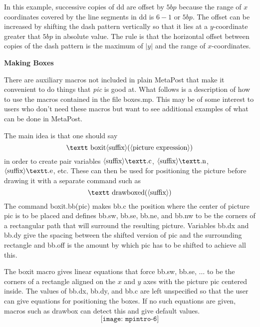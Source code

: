 \documentclass{article}
\def\descr#1{{\langle\hbox{#1}\rangle}}
\def\lit#1{{\hbox{\textt#1}}}
\def\okbreak{\vfil\penalty2000 \vfilneg}
\begin{document}
In this example, successive copies of \lit{dd} are offset by $5bp$ because
the range of $x$ coordinates covered by the line segments in \lit{dd} is
$6-1$ or $5bp$.  The offset can be increased by shifting the dash pattern
vertically so that it lies at a $y$-coordinate greater that $5bp$ in
absolute value.  The rule is that the horizontal offset between copies of
the dash pattern is the maximum of $|y|$ and the range of $x$-coordinates.

\bigbreak
\centerline{\bf Making Boxes}
\nobreak\medskip
There are auxiliary macros not included in plain MetaPost that make it
convenient to do things that {\it pic} is good at.  What follows
is a description of how to use the macros contained in the file \lit{boxes.mp}.
This may be of some interest to users who don't need these macros but want to
see additional examples of what can be done in MetaPost.

The main idea is that one should say
$$ \lit{boxit} \descr{suffix}(\descr{picture expression}) $$
in order to create pair variables $\descr{suffix}\lit{.c}$,
$\descr{suffix}\lit{.n}$, $\descr{suffix}\lit{.e}$, etc.  These can then be
used for positioning the picture before drawing it with a separate command such
as
$$ \lit{drawboxed}(\descr{suffix}) $$
The command \lit{boxit.bb(pic)} makes \lit{bb.c} the position where the center
of picture \lit{pic} is to be placed and defines \lit{bb.sw}, \lit{bb.se},
\lit{bb.ne}, and \lit{bb.nw} to be the corners of a rectangular path that will
surround the resulting picture.  Variables \lit{bb.dx} and \lit{bb.dy} give
the spacing between the shifted version of \lit{pic} and the surrounding
rectangle and \lit{bb.off} is the amount by which \lit{pic} has to be shifted
to achieve all this.

The \lit{boxit} macro gives linear equations that force \lit{bb.sw},
\lit{bb.se}, $\ldots$ to be the corners of a rectangle aligned on the $x$ and
$y$ axes with the picture \lit{pic} centered inside.  The values of \lit{bb.dx},
\lit{bb.dy}, and \lit{bb.c} are left unspecified so that the user can give
equations for positioning the boxes.  If no such equations are given, macros
such as \lit{drawbox} can detect this and give default values.\vadjust{\okbreak}
$$ \texttt{[image: mpintro-6]} $$

\okbreak
\end{document}
